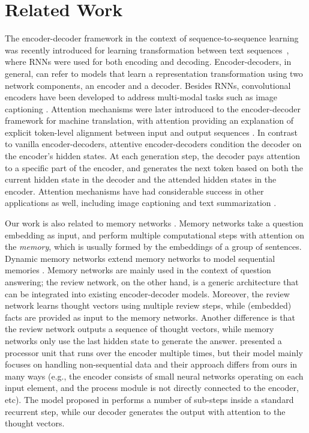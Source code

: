 \documentclass{article}
\begin{document}
\section{Related Work}

The encoder-decoder framework in the context of sequence-to-sequence learning 
was recently introduced for learning transformation between text sequences~\cite{cho2014learning,sutskever2014sequence},
where RNNs were used for both encoding and decoding.
Encoder-decoders, in general, can refer to models that learn a representation transformation using two network components, an encoder and a decoder. Besides RNNs, convolutional encoders have been developed to address multi-modal tasks such as image captioning \cite{vinyals2015show}.
Attention mechanisms were later introduced to the encoder-decoder framework for machine translation, with attention providing an explanation of explicit token-level alignment between input and output sequences \cite{bahdanau2014neural}. In contrast to vanilla encoder-decoders, attentive encoder-decoders condition the decoder on the encoder's hidden states.
At each generation step, the decoder pays attention to a specific part of the encoder, and generates the next token based on both the current hidden state in the decoder and the attended hidden states in the encoder. 
Attention mechanisms have had considerable success in other applications as well, including image captioning \cite{xu2015show} and text summarization \cite{rush2015neural}.

Our work is also related to memory networks \cite{weston2014memory,sukhbaatar2015end}. Memory networks take a question embedding as input, and perform multiple computational steps with attention on the \textit{memory}, which is usually formed by the embeddings of a group of sentences. Dynamic memory networks extend memory networks to model sequential memories \cite{kumar2015ask}. Memory networks are mainly used in the context of question answering; the review network, on the other hand, is a generic architecture that can be integrated into existing encoder-decoder models. Moreover, the review network learns thought vectors using multiple review steps, while (embedded) facts are provided as input to the memory networks. Another difference is that the review network outputs a sequence of thought vectors, while memory networks only use the last hidden state to generate the answer. \cite{vinyals2015order} presented a processor unit that runs over the encoder multiple times, but their model mainly focuses on handling non-sequential data and their approach differs from ours in many ways (e.g., the encoder consists of small neural networks operating on each input element, and the process module is not directly connected to the encoder, etc). The model proposed in \cite{graves2016adaptive} performs a number of sub-steps inside a standard recurrent step, while our decoder generates the output with attention to the thought vectors.
\end{document}
